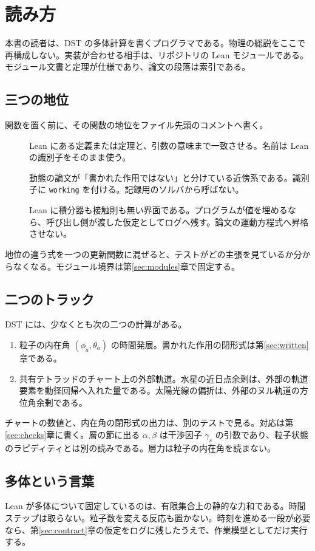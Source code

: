 \section{読み方}
\label{sec:reading}

本書の読者は、DST の多体計算を書くプログラマである。物理の総説をここで再構成しない。実装が合わせる相手は、リポジトリの Lean モジュールである。モジュール文書と定理が仕様であり、論文の段落は索引である。

\subsection{三つの地位}

関数を置く前に、その関数の地位をファイル先頭のコメントへ書く。

\begin{description}
\item[\dstrec] Lean にある定義または定理と、引数の意味まで一致させる。名前は Lean の識別子をそのまま使う。
\item[\dstwork] 動態の論文が「書かれた作用ではない」と分けている近傍系である。識別子に \texttt{working} を付ける。記録用のソルバから呼ばない。
\item[\dstopen] Lean に積分器も接触則も無い界面である。プログラムが値を埋めるなら、呼び出し側が渡した仮定としてログへ残す。論文の運動方程式へ昇格させない。
\end{description}

地位の違う式を一つの更新関数に混ぜると、テストがどの主張を見ているか分からなくなる。モジュール境界は第\ref{sec:modules}章で固定する。

\subsection{二つのトラック}

DST には、少なくとも次の二つの計算がある。

\begin{enumerate}
\item 粒子の内在角 \((\phi_a,\theta_a)\) の時間発展。書かれた作用の閉形式は第\ref{sec:written}章である。
\item 共有テトラッドのチャート上の外部軌道。水星の近日点余剰は、外部の軌道要素を動径回帰へ入れた量である。太陽光線の偏折は、外部のヌル軌道の方位角余剰である。
\end{enumerate}

チャートの数値と、内在角の閉形式の出力は、別のテストで見る。対応は第\ref{sec:checks}章に書く。層の節に出る \(\alpha,\beta\) は干渉因子 \(\gamma_s\) の引数であり、粒子状態のラピディティとは別の読みである。層力は粒子の内在角を読まない。

\subsection{多体という言葉}

Lean が多体について固定しているのは、有限集合上の静的な力和である。時間ステップは取らない。粒子数を変える反応も置かない。時刻を進める一段が必要なら、第\ref{sec:contract}章の仮定をログに残したうえで、作業模型としてだけ実行する。
